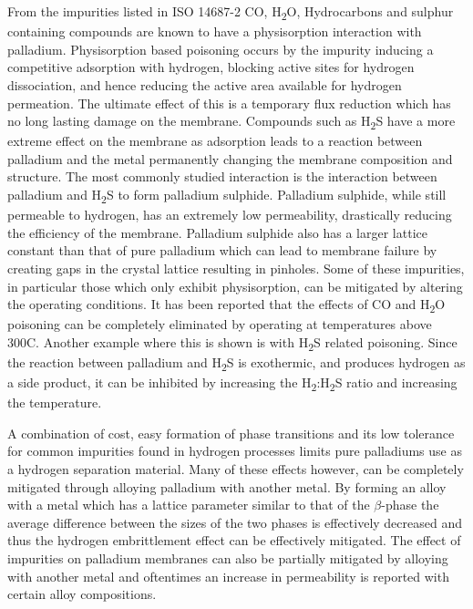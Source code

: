 From the impurities listed in ISO 14687-2 CO, H\textsubscript{2}O, Hydrocarbons and sulphur 
containing compounds are known to have a physisorption interaction with palladium. 
Physisorption based poisoning occurs by the impurity inducing a competitive adsorption 
with hydrogen, blocking active sites for hydrogen dissociation, and hence reducing the 
active area available for hydrogen permeation.\cite{Gao2004} The ultimate effect of this is a temporary 
flux reduction which has no long lasting damage on the membrane. Compounds such as 
H\textsubscript{2}S have a more extreme effect on the membrane as 
adsorption leads to a reaction between palladium and the metal permanently changing the 
membrane composition and structure. The most commonly studied interaction is the interaction 
between palladium and H\textsubscript{2}S to form palladium sulphide. Palladium sulphide, while still
permeable to hydrogen, has an extremely low permeability, drastically reducing the efficiency 
of the membrane. Palladium sulphide also has a larger lattice constant than that of pure 
palladium which can lead to membrane failure by creating gaps in the crystal lattice 
resulting in pinholes. Some of these impurities, in particular those which only exhibit 
physisorption, can be mitigated by altering the operating conditions. It has been reported 
that the effects of CO and H\textsubscript{2}O poisoning can be completely eliminated by operating at 
temperatures above 300\textdegree C. Another example where this is shown is with H\textsubscript{2}S related poisoning. 
Since the reaction between palladium and H\textsubscript{2}S is exothermic, and produces hydrogen as a side 
product, it can be inhibited by increasing the H\textsubscript{2}:H\textsubscript{2}S ratio and increasing the temperature.  

A combination of cost, easy formation of phase transitions \cite{Flanagan1991, Li2008b} and its low tolerance for 
common impurities found in hydrogen processes limits pure palladiums use as a hydrogen 
separation material. Many of these effects however, can be completely mitigated through 
alloying palladium with another metal. By forming an alloy with a metal which has a lattice 
parameter similar to that of the $\beta$-phase the average difference between the sizes of 
the two phases is effectively decreased and thus the hydrogen embrittlement effect can be 
effectively mitigated. The effect of impurities on palladium membranes can also be partially 
mitigated by alloying with another metal and oftentimes an increase in permeability is 
reported with certain alloy compositions. 

